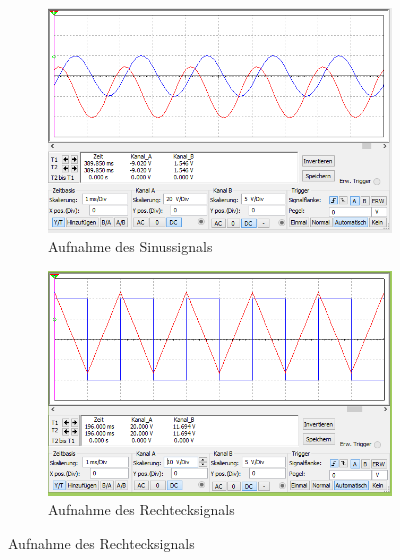 \documentclass[12pt,a4paper]{article}
\begin{document}
\begin{figure}[H]
        \centering
        \begin{subfigure}[t]{0.28\textwidth}
                \includegraphics[width=\textwidth , scale = 0.4]{4_4_sin.PNG}
                \caption[Aufnahme des Sinussignals]{Aufnahme des Sinussignals}
                \label{fig:4_4_sin}
        \end{subfigure}%
        \hfill
        \begin{subfigure}[t]{0.28\textwidth}
                \includegraphics[width=\textwidth , scale = 0.4]{4_4_recht.PNG}
                \caption[Aufnahme des Rechtecksignals]{Aufnahme des Rechtecksignals}
                \label{fig:4_4_recht}
        \end{subfigure}

\end{figure}
\end{document}
